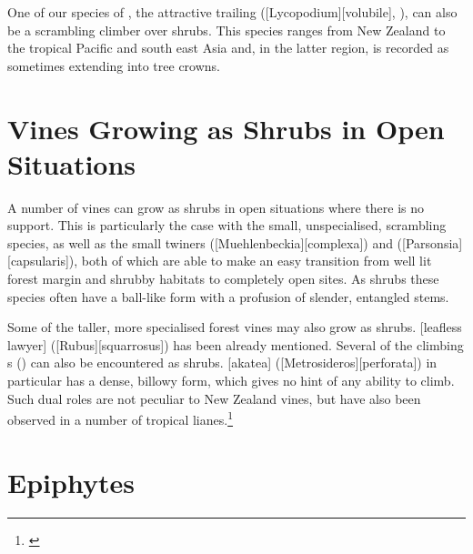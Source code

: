 One of our species of , the attractive trailing  ([Lycopodium][volubile], ), can also be a scrambling climber over shrubs.
This species ranges from New Zealand to the tropical Pacific and south east Asia and, in the latter region, is recorded as sometimes extending into tree crowns.

\section{Vines Growing as Shrubs in Open Situations}

A number of vines can grow as shrubs in open situations where there is no support.
This is particularly the case with the small, unspecialised, scrambling species, as well as the small twiners  ([Muehlenbeckia][complexa]) and  ([Parsonsia][capsularis]), both of which are able to make an easy transition from well lit forest margin and shrubby habitats to completely open sites.
As shrubs these species often have a ball-like form with a profusion of slender, entangled stems.

Some of the taller, more specialised forest vines may also grow as shrubs.
[leafless lawyer] ([Rubus][squarrosus]) has been already mentioned.
Several of the climbing s () can also be encountered as shrubs.
[akatea] ([Metrosideros][perforata]) in particular has a dense, billowy form, which gives no hint of any ability to climb.
Such dual roles are not peculiar to New Zealand vines, but have also been observed in a number of tropical lianes.\footnote{\cite{richards1952tropical}}

\section{Epiphytes}


